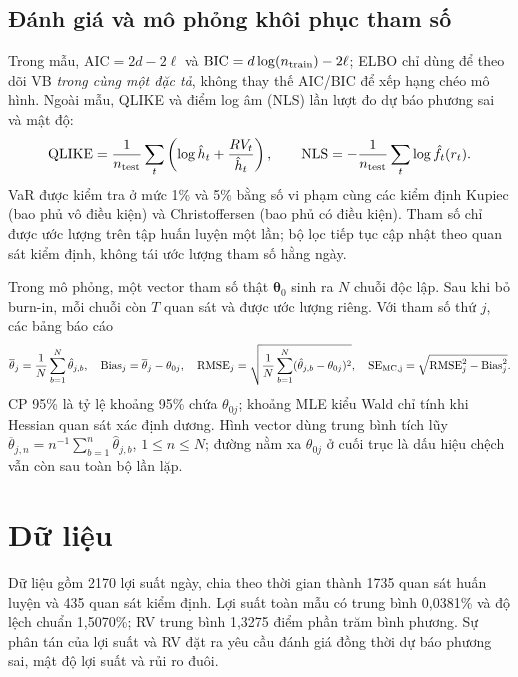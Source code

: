 \documentclass[11pt,a4paper]{article}
\begin{document}
\subsection{Đánh giá và mô phỏng khôi phục tham số}
Trong mẫu, $\mathrm{AIC}=2d-2\ell$ và
$\mathrm{BIC}=d\log(n_{\rm train})-2\ell$; ELBO chỉ dùng để theo dõi VB
\emph{trong cùng một đặc tả}, không thay thế AIC/BIC để xếp hạng chéo mô hình.
Ngoài mẫu, QLIKE và điểm log âm (NLS) lần lượt đo dự báo phương sai và mật độ:
\begin{equation}\label{eq:scores}
\mathrm{QLIKE}=\frac1{n_{\rm test}}\sum_t\left(\log\hat h_t+\frac{RV_t}{\hat h_t}\right),
\qquad
\mathrm{NLS}=-\frac1{n_{\rm test}}\sum_t\log\hat f_t(r_t).
\end{equation}
VaR được kiểm tra ở mức 1\% và 5\% bằng số vi phạm cùng các kiểm định
Kupiec (bao phủ vô điều kiện) và Christoffersen (bao phủ có điều kiện).
Tham số chỉ được ước lượng trên tập huấn luyện một lần; bộ lọc tiếp tục cập
nhật theo quan sát kiểm định, không tái ước lượng tham số hằng ngày.

Trong mô phỏng, một vector tham số thật $\boldsymbol\theta_0$ sinh ra $N$
chuỗi độc lập. Sau khi bỏ burn-in, mỗi chuỗi còn $T$ quan sát và được ước
lượng riêng. Với tham số thứ $j$, các bảng báo cáo
\begin{equation}\label{eq:recovery}
\overline\theta_j=\frac1N\sum_{b=1}^N\hat\theta_{j,b},\quad
\mathrm{Bias}_j=\overline\theta_j-\theta_{0j},\quad
\mathrm{RMSE}_j=\sqrt{\frac1N\sum_{b=1}^N
 (\hat\theta_{j,b}-\theta_{0j})^2},\quad
\mathrm{SE}_{\rm MC,j}=\sqrt{\mathrm{RMSE}_j^2-\mathrm{Bias}_j^2}.
\end{equation}
CP 95\% là tỷ lệ khoảng 95\% chứa $\theta_{0j}$; khoảng MLE kiểu Wald
chỉ tính khi Hessian quan sát xác định dương. Hình vector dùng trung bình
tích lũy $\overline\theta_{j,n}=n^{-1}\sum_{b=1}^n\hat\theta_{j,b}$,
$1\le n\le N$; đường nằm xa $\theta_{0j}$ ở cuối trục là dấu hiệu chệch
vẫn còn sau toàn bộ lần lặp.

\section{Dữ liệu}
Dữ liệu gồm 2170 lợi suất ngày, chia theo thời gian thành 1735 quan sát huấn luyện và 435 quan sát kiểm định. Lợi suất toàn mẫu có trung bình 0,0381\% và độ lệch chuẩn 1,5070\%; RV trung bình 1,3275 điểm phần trăm bình phương. Sự phân tán của lợi suất và RV đặt ra yêu cầu đánh giá đồng thời dự báo phương sai, mật độ lợi suất và rủi ro đuôi.
\end{document}
